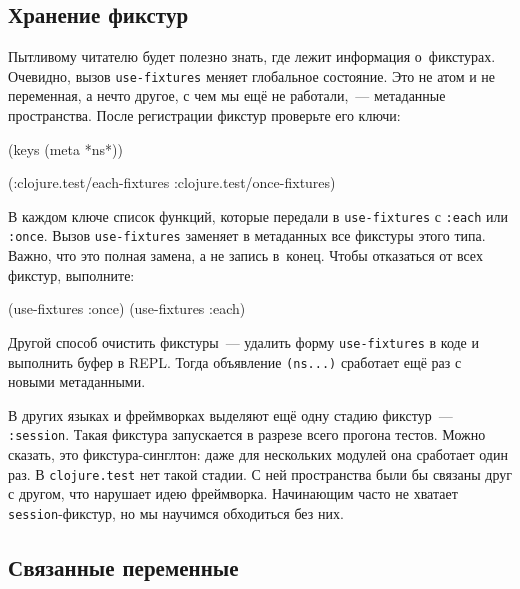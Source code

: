 \subsection{Хранение фикстур}

Пытливому читателю будет полезно знать, где лежит информация о~фикстурах. Очевидно,
вызов \verb|use-fixtures| меняет глобальное состояние. Это не атом и не
переменная, а нечто другое, с чем мы ещё не работали,~--- метаданные
пространства. После регистрации фикстур проверьте его ключи:


\begin{english}
  \begin{clojure}
(keys (meta *ns*))

(:clojure.test/each-fixtures
 :clojure.test/once-fixtures)
  \end{clojure}
\end{english}

В каждом ключе список функций, которые передали в \texttt{use\--fix\-tur\-es} с
\verb|:each| или \verb|:once|. Вызов \verb|use-fixtures| заменяет в метаданных
все фикстуры этого типа. Важно, что это полная замена, а не запись
в~конец. Чтобы отказаться от всех фикстур, выполните:

\begin{english}
  \begin{clojure}
(use-fixtures :once)
(use-fixtures :each)
  \end{clojure}
\end{english}

Другой способ очистить фикстуры~--- удалить форму \texttt{use\--fix\-tu\-res} в коде и
выполнить буфер в REPL. Тогда объявление \verb|(ns...)|
сработает ещё раз с новыми метаданными.

\label{fix-session}

В других языках и фреймворках выделяют ещё одну стадию фикстур~---
\verb|:session|. Такая фикстура запускается в разрезе всего прогона
тестов. Можно сказать, это фикстура-синглтон: даже для нескольких модулей она
сработает один раз. В \verb|clojure.test| нет такой стадии. С ней пространства
были бы связаны друг с другом, что нарушает идею фреймворка. Начинающим часто не
хватает \verb|session|-фикстур, но мы научимся обходиться без них.

\subsection{Связанные переменные}

